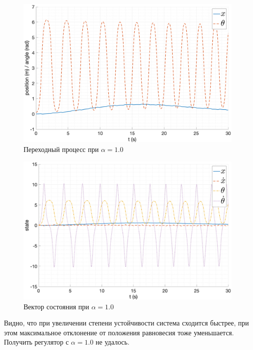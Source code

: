 \begin{figure}[ht!]
    \centering
    \includegraphics[width=\textwidth]{media/plots/nonmodal_controlers_min/out_6.png}
    \caption{Переходный процесс при $\alpha = 1.0$}
    \label{fig:nonmodal_control_alpha_2_3}
\end{figure} 
\begin{figure}[ht!]
    \centering
    \includegraphics[width=\textwidth]{media/plots/nonmodal_controlers_min/state_6.png}
    \caption{Вектор состояния при $\alpha = 1.0$}
    \label{fig:nonmodal_control_alpha_2_3_state}
\end{figure}
\FloatBarrier 

Видно, что при увеличении степени устойчивости система сходится быстрее, при этом 
максимальное отклонение от положения равновесия тоже уменьшается. 
Получить регулятор с $\alpha = 1.0$ не удалось. 

